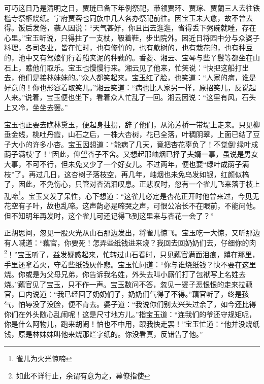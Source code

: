 \documentclass[12pt,oneside]{book}
\begin{document}
可巧这日乃是清明之日，贾琏已备下年例祭祀，带领贾环、贾琮、贾蘭三人去往铁槛寺祭柩烧纸。宁府贾蓉也同族中几人各办祭祀前往。因宝玉未大愈，故不曾去得。饭后发倦，袭人因说：“天气甚好，你且出去逛逛，省得丢下粥碗就睡，存在心里。”宝玉听说，只得拄了一支杖，靸着鞋，步出院外。因近日将园中分与众婆子料理，各司各业，皆在忙时，也有修竹的，也有歍树的，也有栽花的，也有种豆的，池中又有驾娘们行着船夹泥的种藕的。香菱、湘云、宝琴与些丫鬟等都坐在山石上，瞧他们取乐。宝玉也慢慢行来。湘云见了他来，忙笑说：“快把这船打出去，他们是接林妹妹的。”众人都笑起来。宝玉红了脸，也笑道：“人家的病，谁是好意的！你也形容着取笑儿。”湘云笑道：“病也比人家另一样，原招笑儿，反说起人来。”说着，宝玉便也坐下，看着众人忙乱了一回。湘云因说：“这里有风，石头上又冷，坐坐去罢。”

宝玉也正要去瞧林黛玉，便起身拄拐，辞了他们，从沁芳桥一带堤上走来。只见柳垂金线，桃吐丹霞，山石之后，一株大杏树，花已全落，叶稠阴翠，上面已结了豆子大小的许多小杏。宝玉因想道：“能病了几天，竟把杏花辜负了！不觉倒‘绿叶成荫子满枝’了！”因此，仰望杏子不舍。又想起邢岫烟已择了夫婿一事，虽说是男女大事，不可不行，但未免又少了一个好女儿。不过两年，便也要“绿叶成荫子满枝”了。再过几日，这杏树子落枝空，再几年，岫烟也未免乌发如银，红颜似槁了，因此，不免伤心，只管对杏流泪叹息。正悲叹时，忽有一个雀儿飞来落于枝上乱啼\footnote{雀儿为火光惊啼}。宝玉又发了呆性，心下想道：“这雀儿必定是杏花正开时他曾来过，今见无花空有子叶，故也乱啼。这声韵必是啼哭之声，可恨公冶长不在眼前，不能问他。但不知明年再发时，这个雀儿可还记得飞到这里来与杏花一会了？”

正胡思间，忽见一股火光从山石那边发出，将雀儿惊飞。宝玉吃一大惊，又听那边有人喊道：“藕官，你要死！怎弄些纸钱进来烧？我回去回奶奶们去，仔细你的肉\footnote{如此不详行止，余谓有意为之，幕僚指使}！”宝玉听了，益发疑惑起来，忙转过山石看时，只见藕官满面泪痕，蹲在那里，手里还拿着火，守着些纸钱灰作悲。宝玉忙问道：“你与谁烧纸钱？快不要在这里烧。你或是为父母兄弟，你告诉我名姓，外头去叫小厮们打了包袱写上名姓去烧。”藕官见了宝玉，只不作一声。宝玉数问不答，忽见一婆子恶恨恨的走来拉藕官，口内说道：“我已经回了奶奶们了，奶奶们气得了不得。”藕官听了，终是孩气，怕辱没了没脸，便不肯去。婆子道：“我说你们别太兴头过余了，如今还比得你们在外头随心乱闹呢！这是尺寸地方儿。”指宝玉道：“连我们的爷还守规矩呢，你是什么阿物儿，跑来胡闹！怕也不中用，跟我快走罢！”宝玉忙道：“他并没烧纸钱，原是林妹妹叫他来烧那烂字纸的。你没看真，反错告了他。”
\end{document}
